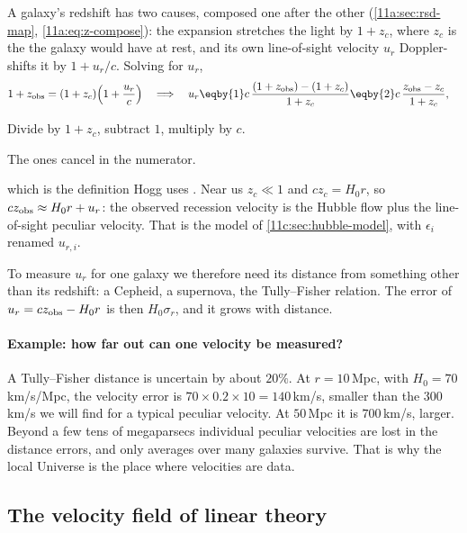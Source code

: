 A galaxy's redshift has two causes, composed one after the other
(\cref{11a:sec:rsd-map}, \eqref{11a:eq:z-compose}): the expansion stretches the light
by $1+z_c$, where $z_c$ is the  the galaxy would have
at rest, and its own line-of-sight velocity $u_r$ Doppler-shifts it by $1+u_r/c$.
Solving for $u_r$,
\begin{align}
  1+z_{\rm obs}=(1+z_c)\Bigl(1+\frac{u_r}{c}\Bigr)
  \quad\Longrightarrow\quad
  u_r
  &\eqby{1}c\,\frac{(1+z_{\rm obs})-(1+z_c)}{1+z_c}
   \eqby{2}c\,\frac{z_{\rm obs}-z_c}{1+z_c},
  \label{11c:eq:vpec-z}
\end{align}
\begin{explain}
  \item Divide by $1+z_c$, subtract $1$, multiply by $c$.
  \item The ones cancel in the numerator.
\end{explain}
which is the definition Hogg uses \cite[eq.~(10)]{Hogg1999}. Near us
$z_c\ll1$ and $cz_c=H_0r$, so $cz_{\rm obs}\approx H_0r+u_r$: the observed
recession velocity is the Hubble flow plus the line-of-sight peculiar velocity.
That is the model of \cref{11c:sec:hubble-model}, with $\epsilon_i$ renamed
$u_{r,i}$.

To measure $u_r$ for one galaxy we therefore need its distance from something
other than its redshift: a Cepheid, a supernova, the Tully--Fisher relation. The
error of $u_r=cz_{\rm obs}-H_0r$ is then $H_0\sigma_r$, and it grows with distance.

\paragraph{Example: how far out can one velocity be measured?} A Tully--Fisher
distance is uncertain by about $20\%$. At $r=10$\,Mpc, with $H_0=70$\,km/s/Mpc, the
velocity error is $70\times0.2\times10=140$\,km/s, smaller than the $300$\,km/s we
will find for a typical peculiar velocity. At $50$\,Mpc it is $700$\,km/s, larger.
Beyond a few tens of megaparsecs individual peculiar velocities are lost in the
distance errors, and only averages over many galaxies survive. That is why the
local Universe is the place where velocities are data.

\subsection{The velocity field of linear theory}
\label{11c:sec:pv-linear}

